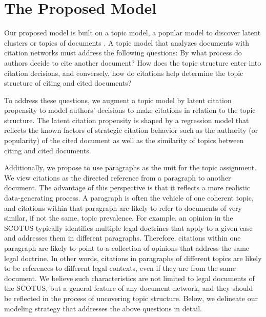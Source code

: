 \section{The Proposed Model}
\label{sec:model}
Our proposed model is built on a topic model, a popular model to discover latent clusters or topics of documents \citep{blei2003lda, blei2007correlated}. 
A topic model that analyzes documents with citation networks must address the following questions: 
By what process do authors decide to cite another document? 
How does the topic structure enter into citation decisions, and conversely, how do citations help determine the topic structure of citing and cited documents? 

To address these questions, we augment a topic model by latent citation propensity to model authors' decisions to make citations in relation to the topic structure. 
The latent citation propensity is shaped by a regression model that reflects the known factors of strategic citation behavior such as the authority (or popularity) of the cited document \citep{larsson2017speaking, lupu2012precedent, lupu2013strategic, pelc2014politics} as well as the similarity of topics between citing and cited documents.

Additionally, we propose to use paragraphs as the unit for the topic assignment. 
We view citations as the directed reference from a paragraph to another document. 
The advantage of this perspective is that it reflects a more realistic data-generating process. 
A paragraph is often the vehicle of one coherent topic, and citations within that paragraph are likely to refer to documents of very similar, if not the same, topic prevalence. 
For example, an opinion in the SCOTUS typically identifies multiple legal doctrines that apply to a given case and addresses them in different paragraphs. 
Therefore, citations within one paragraph are likely to point to a collection of opinions that address the same legal doctrine. 
In other words, citations in paragraphs of different topics are likely to be references to different legal contexts, even if they are from the same document. 
We believe such characteristics are not limited to legal documents of the SCOTUS, but a general feature of any document network, and they should be reflected in the process of uncovering topic structure. 
Below, we delineate our modeling strategy that addresses the above questions in detail. 

